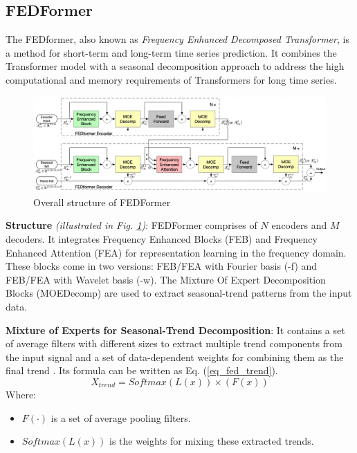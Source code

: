 \documentclass[conference]{IEEEtran}
\begin{document}
\subsection{FEDFormer}
The FEDformer, also known as \textit{Frequency Enhanced Decomposed Transformer}, is a method for short-term and long-term time series prediction. It combines the Transformer model with a seasonal decomposition approach to address the high computational and memory requirements of Transformers for long time series.\par
\begin{figure}[H]
    \centering
    \begin{minipage}{0.45\textwidth}
    \centering
    \includegraphics[width=1\textwidth]{figures/method/FEDFormer_structure.png}
    \caption{Overall structure of FEDFormer}
    \label{fig_fedformer}
    \end{minipage}
\end{figure}\par
\textbf{Structure} \textit{(illustrated in Fig. \ref{fig_fedformer})}: FEDFormer comprises of \(N\) encoders and \(M\) decoders. It integrates Frequency Enhanced Blocks (FEB) and Frequency Enhanced Attention (FEA) for representation learning in the frequency domain. These blocks come in two versions: FEB/FEA with Fourier basis (-f) and FEB/FEA with Wavelet basis (-w). The Mixture Of Expert Decomposition Blocks (MOEDecomp) are used to extract seasonal-trend patterns from the input data.\par
\textbf{Mixture of Experts for Seasonal-Trend Decomposition}: 
It contains a set of average filters with different sizes to extract multiple trend components from the input signal and a set of data-dependent weights for combining them as the final trend \cite{b6}. Its formula can be written as Eq. (\ref{eq_fed_trend}).
\begin{equation}\label{eq_fed_trend}
    X_{trend} = Softmax(L(x)) \times (F(x))
\end{equation}
Where:\par
\begin{itemize}
    \item \(F(\cdot)\) is a set of average pooling filters.
    \item \(Softmax(L(x))\) is the weights for mixing these extracted trends.
\end{itemize}
\end{document}

